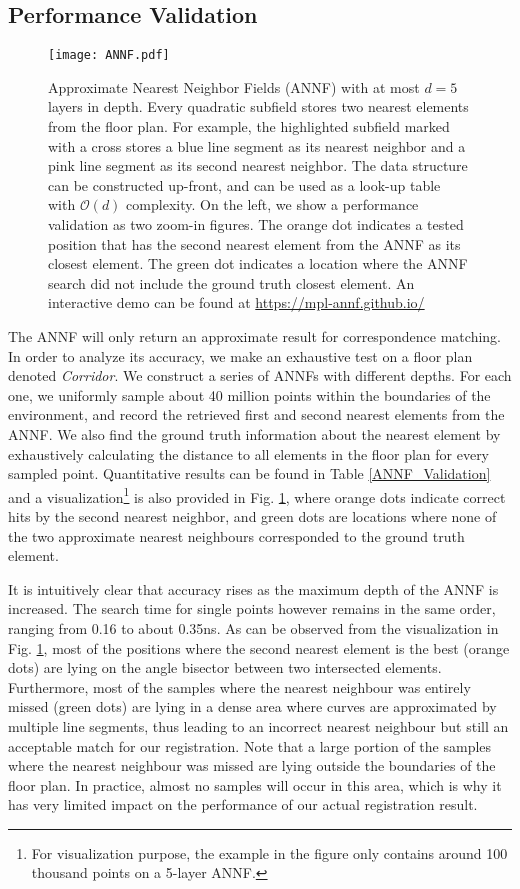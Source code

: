 \documentclass[letterpaper, 10 pt, conference]{ieeeconf}  %
\begin{document}
\subsection{Performance Validation}
%
\begin{figure}[t]
  \centering
  \texttt{[image: ANNF.pdf]}
  \caption{Approximate Nearest Neighbor Fields (ANNF) with at most $d = 5$ layers in depth. Every quadratic subfield stores two nearest elements from the floor plan. For example, the highlighted subfield marked with a cross stores a blue line segment as its nearest neighbor and a pink line segment as its second nearest neighbor. The data structure can be constructed up-front, and can be used as a look-up table with $\mathcal{O}(d)$ complexity. On the left, we show a performance validation as two zoom-in figures. The orange dot indicates a tested position that has the second nearest element from the ANNF as its closest element. The green dot indicates a location where the ANNF search did not include the ground truth closest element. An interactive demo can be found at \url{https://mpl-annf.github.io/}}
  \label{ANNF_diagram}
\end{figure}
%
The ANNF will only return an approximate result for correspondence matching. In order to analyze its accuracy, we make an exhaustive test on a floor plan denoted \textit{Corridor}. We construct a series of ANNFs with different depths. For each one, we uniformly sample about 40 million points within the boundaries of the environment, and record the retrieved first and second nearest elements from the ANNF. We also find the ground truth information about the nearest element by exhaustively calculating the distance to all elements in the floor plan for every sampled point. Quantitative results can be found in Table \ref{ANNF_Validation} and a visualization\footnote{For visualization purpose, the example in the figure only contains around 100 thousand points on a 5-layer ANNF.} is also provided in Fig. \ref{ANNF_diagram}, where orange dots indicate correct hits by the second nearest neighbor, and green dots are locations where none of the two approximate nearest neighbours corresponded to the ground truth element.

It is intuitively clear that accuracy rises as the maximum depth of the ANNF is increased. The search time for single points however remains in the same order, ranging from 0.16 to about 0.35ns. As can be observed from the visualization in Fig. \ref{ANNF_diagram}, most of the positions where the second nearest element is the best (orange dots) are lying on the angle bisector between two intersected elements. Furthermore, most of the samples where the nearest neighbour was entirely missed (green dots) are lying in a dense area where curves are approximated by multiple line segments, thus leading to an incorrect nearest neighbour but still an acceptable match for our registration. Note that a large portion of the samples where the nearest neighbour was missed are lying outside the boundaries of the floor plan. In practice, almost no samples will occur in this area, which is why it has very limited impact on the performance of our actual registration result.
\end{document}
